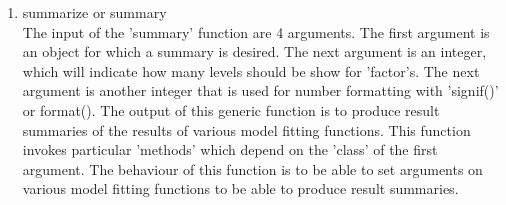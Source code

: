 \documentclass{article}
\begin{document}
\begin{enumerate}
\begin{enumerate}
\\
\item {summarize or summary}
\\
The input of the 'summary' function are 4 arguments. The first argument is an object for which a summary is desired. The next argument is an integer, which will indicate how many levels should be show for 'factor's. The next argument is another integer that is used for number formatting with 'signif()' or format(). The output of this generic function is to produce result summaries of the results of various model fitting functions. This function invokes particular 'methods' which depend on the 'class' of the first argument. The behaviour of this function is to be able to set arguments on various model fitting functions to be able to produce result summaries.
\end{enumerate}
\end{enumerate}
\end{document}
